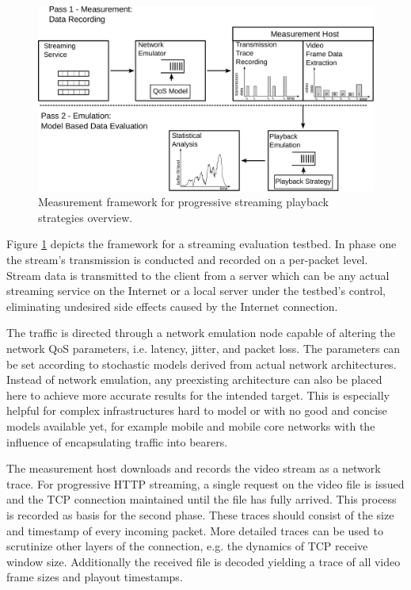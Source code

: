 \begin{figure}[htb]
    \includegraphics[width=1.0\textwidth]{images/measurement-model.pdf}
    \caption{Measurement framework for progressive streaming playback strategies overview.}
    \label{c3:fig:framework}
\end{figure}

Figure \ref{c3:fig:framework} depicts the framework for a streaming evaluation testbed. In phase one the stream's transmission is conducted and recorded on a per-packet level. Stream data is transmitted to the client from a server which can be any actual streaming service on the Internet or a local server under the testbed's control, eliminating undesired side effects caused by the Internet connection. 

The traffic is directed through a network emulation node capable of altering the network \gls{QoS} parameters, i.e. latency, jitter, and packet loss. The parameters can be set according to stochastic models derived from actual network architectures. Instead of network emulation, any preexisting architecture can also be placed here to achieve more accurate results for the intended target. This is especially helpful for complex infrastructures hard to model or with no good and concise models available yet, for example mobile and mobile core networks with the influence of encapsulating traffic into bearers.

The measurement host downloads and records the video stream as a network trace. For progressive \gls{HTTP} streaming, a single request on the video file is issued and the \gls{TCP} connection maintained until the file has fully arrived.
This process is recorded as basis for the second phase. These traces should consist of the size and timestamp of every incoming packet. More detailed traces can be used to scrutinize other layers of the connection, e.g. the dynamics of TCP receive window size. Additionally the received file is decoded yielding a trace of all video frame sizes and playout timestamps.

